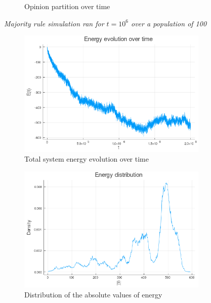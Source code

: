 \documentclass[12pt,openright,twoside]{book}
\begin{document}
\begin{appendices}
\begin{figure}[!htb]
\begin{subfigure}[b]{0.65\linewidth}
    \caption{Opinion partition over time}
\end{subfigure}
\caption{\textit{{\small Majority rule simulation ran for $t=10^6$ over a population of 100}}}
\label{2_1}
\end{figure}

\begin{figure}[!htb]
\centering
\begin{subfigure}[b]{0.49\linewidth}
    \includegraphics[width=\linewidth]{figures/2_2_er/energy_evolution.png}
    \caption{Total system energy evolution over time}
\end{subfigure}
\begin{subfigure}[b]{0.49\linewidth}
    \includegraphics[width=\linewidth]{figures/2_2_er/energy_distribution.png}
    \caption{Distribution of the absolute values of energy}
\end{subfigure}
\begin{subfigure}[b]{0.49\linewidth}

\end{subfigure}
\end{figure}
\end{appendices}
\end{document}
